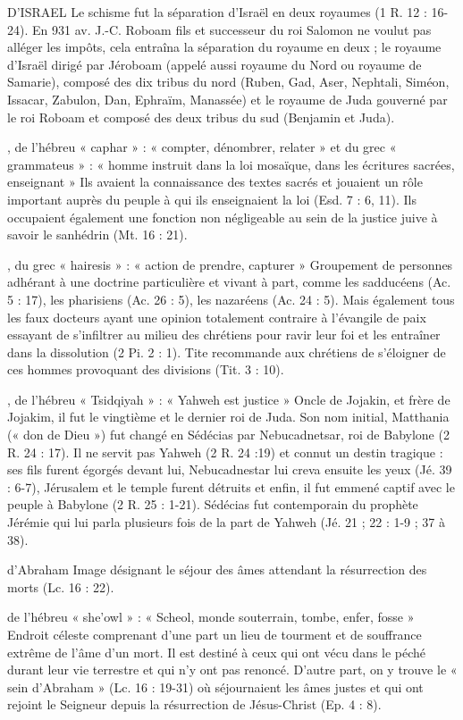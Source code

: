 \begin{multicols}{2}
D'ISRAEL
Le schisme fut la séparation d'Israël en deux royaumes (1 R. 12 : 16-24). En 931 av. J.-C. Roboam fils et successeur du roi Salomon ne voulut pas alléger les impôts, cela entraîna la séparation du royaume en deux ; le royaume d'Israël dirigé par Jéroboam (appelé aussi royaume du Nord ou royaume de Samarie), composé des dix tribus du nord (Ruben, Gad, Aser, Nephtali, Siméon, Issacar, Zabulon, Dan, Ephraïm, Manassée) et le royaume de Juda gouverné par le roi Roboam et composé des deux tribus du sud (Benjamin et Juda).


, de l'hébreu « caphar » : « compter, dénombrer, relater » et du grec « grammateus » : « homme instruit dans la loi mosaïque, dans les écritures sacrées, enseignant »
Ils avaient la connaissance des textes sacrés et jouaient un rôle important auprès du peuple à qui ils enseignaient la loi (Esd. 7 : 6, 11). Ils occupaient également une fonction non négligeable au sein de la justice juive à savoir le sanhédrin (Mt. 16 : 21).


, du grec « hairesis » : « action de prendre, capturer »
Groupement de personnes adhérant à une doctrine particulière et vivant à part, comme les sadducéens (Ac. 5 : 17), les pharisiens (Ac. 26 : 5), les nazaréens (Ac. 24 : 5). Mais également tous les faux docteurs ayant une opinion totalement contraire à l'évangile de paix essayant de s'infiltrer au milieu des chrétiens pour ravir leur foi et les entraîner dans la dissolution (2 Pi. 2 : 1). Tite recommande aux chrétiens de s'éloigner de ces hommes provoquant des divisions (Tit. 3 : 10).


, de l'hébreu « Tsidqiyah » : « Yahweh est justice »
Oncle de Jojakin, et frère de Jojakim, il fut le vingtième et le dernier roi de Juda. Son nom initial, Matthania (« don de Dieu ») fut changé en Sédécias par Nebucadnetsar, roi de Babylone (2 R. 24 : 17). Il ne servit pas Yahweh (2 R. 24 :19) et connut un destin tragique : ses fils furent égorgés devant lui, Nebucadnestar lui creva ensuite les yeux (Jé. 39 : 6-7), Jérusalem et le temple furent détruits et enfin, il fut emmené captif avec le peuple à Babylone (2 R. 25 : 1-21). Sédécias fut contemporain du prophète Jérémie qui lui parla plusieurs fois de la part de Yahweh (Jé. 21 ; 22 : 1-9 ; 37 à 38).


d'Abraham
Image désignant le séjour des âmes attendant la résurrection des morts (Lc. 16 : 22).


de l'hébreu « she'owl » : « Scheol, monde souterrain, tombe, enfer, fosse »
Endroit céleste comprenant d'une part un lieu de tourment et de souffrance extrême de l'âme d'un mort. Il est destiné à ceux qui ont vécu dans le péché durant leur vie terrestre et qui n'y ont pas renoncé. D'autre part, on y trouve le « sein d'Abraham » (Lc. 16 : 19-31) où séjournaient les âmes justes et qui ont rejoint le Seigneur depuis la résurrection de Jésus-Christ (Ep. 4 : 8).


\end{multicols}
